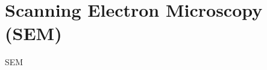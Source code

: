 \documentclass[\main/dresen_thesis.tex]{subfiles}
\begin{document}
  \section{Scanning Electron Microscopy (SEM)}
    \label{app:methods:sem}
    SEM
\end{document}
